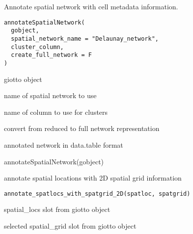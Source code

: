 \documentclass[a4paper]{book}
\begin{document}
%
\begin{Description}\relax
Annotate spatial network with cell metadata information.
\end{Description}
%
\begin{Usage}
\begin{verbatim}
annotateSpatialNetwork(
  gobject,
  spatial_network_name = "Delaunay_network",
  cluster_column,
  create_full_network = F
)
\end{verbatim}
\end{Usage}
%
\begin{Arguments}
\begin{ldescription}
\item[\code{gobject}] giotto object

\item[\code{spatial\_network\_name}] name of spatial network to use

\item[\code{cluster\_column}] name of column to use for clusters

\item[\code{create\_full\_network}] convert from reduced to full network representation
\end{ldescription}
\end{Arguments}
%
\begin{Value}
annotated network in data.table format
\end{Value}
%
\begin{Examples}
\begin{ExampleCode}
    annotateSpatialNetwork(gobject)
\end{ExampleCode}
\end{Examples}
%
\begin{Description}\relax
annotate spatial locations with 2D spatial grid information
\end{Description}
%
\begin{Usage}
\begin{verbatim}
annotate_spatlocs_with_spatgrid_2D(spatloc, spatgrid)
\end{verbatim}
\end{Usage}
%
\begin{Arguments}
\begin{ldescription}
\item[\code{spatloc}] spatial\_locs slot from giotto object

\item[\code{spatgrid}] selected spatial\_grid slot from giotto object
\end{ldescription}
\end{Arguments}
\end{document}
